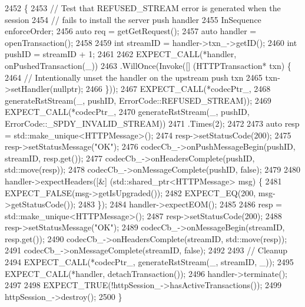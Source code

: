 \begin{DoxyCode}
2452                                                             \{
2453   \textcolor{comment}{// Test that REFUSED\_STREAM error is generated when the session}
2454   \textcolor{comment}{// fails to install the server push handler}
2455   InSequence enforceOrder;
2456   \textcolor{keyword}{auto} req = getGetRequest();
2457   \textcolor{keyword}{auto} handler = openTransaction();
2458 
2459   \textcolor{keywordtype}{int} streamID = handler->txn\_->getID();
2460   \textcolor{keywordtype}{int} pushID = streamID + 1;
2461 
2462   EXPECT\_CALL(*handler, onPushedTransaction(\_))
2463     .WillOnce(Invoke([] (HTTPTransaction* txn) \{
2464             \textcolor{comment}{// Intentionally unset the handler on the upstream push txn}
2465             txn->setHandler(\textcolor{keyword}{nullptr});
2466           \}));
2467   EXPECT\_CALL(*codecPtr\_,
2468               generateRstStream(\_, pushID, ErrorCode::REFUSED\_STREAM));
2469   EXPECT\_CALL(*codecPtr\_,
2470               generateRstStream(\_, pushID, ErrorCode::\_SPDY\_INVALID\_STREAM))
2471     .Times(2);
2472 
2473   \textcolor{keyword}{auto} resp = std::make\_unique<HTTPMessage>();
2474   resp->setStatusCode(200);
2475   resp->setStatusMessage(\textcolor{stringliteral}{"OK"});
2476   codecCb\_->onPushMessageBegin(pushID, streamID, resp.get());
2477   codecCb\_->onHeadersComplete(pushID, std::move(resp));
2478   codecCb\_->onMessageComplete(pushID, \textcolor{keyword}{false});
2479 
2480   handler->expectHeaders([&] (std::shared\_ptr<HTTPMessage> msg) \{
2481       EXPECT\_FALSE(msg->getIsUpgraded());
2482       EXPECT\_EQ(200, msg->getStatusCode());
2483     \});
2484   handler->expectEOM();
2485 
2486   resp = std::make\_unique<HTTPMessage>();
2487   resp->setStatusCode(200);
2488   resp->setStatusMessage(\textcolor{stringliteral}{"OK"});
2489   codecCb\_->onMessageBegin(streamID, resp.get());
2490   codecCb\_->onHeadersComplete(streamID, std::move(resp));
2491   codecCb\_->onMessageComplete(streamID, \textcolor{keyword}{false});
2492 
2493   \textcolor{comment}{// Cleanup}
2494   EXPECT\_CALL(*codecPtr\_, generateRstStream(\_, streamID, \_));
2495   EXPECT\_CALL(*handler, detachTransaction());
2496   handler->terminate();
2497 
2498   EXPECT\_TRUE(!httpSession\_->hasActiveTransactions());
2499   httpSession\_->destroy();
2500 \}
\end{DoxyCode}
